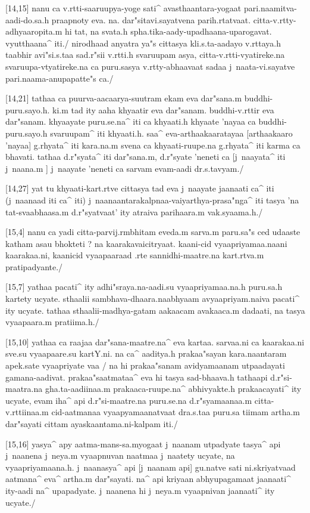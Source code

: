 [14,15]	nanu ca v.rtti-saaruupya-yoge sati^ avasthaantara-yogaat 
pari.naamitva-aadi-do.sa.h praapnoty eva. na. dar"sitavi.sayatvena parih.rtatvaat. 
citta-v.rtty-adhyaaropita.m hi tat, na svata.h 
spha.tika-aady-upadhaana-uparogavat. vyutthaana^ iti./ nirodhaad anyatra ya"s 
cittasya kli.s.ta-aadayo v.rttaya.h taabhir avi"si.s.taa sad.r"sii v.rtti.h svaruupam 
asya, citta-v.rtti-vyatireke.na svaruupa-vtyatireke.na ca puru.sasya 
v.rtty-abhaavaat sadaa j~naata-vi.sayatve pari.naama-anupapatte"s ca./

[14,21]	tathaa ca puurva-aacaarya-suutram ekam eva dar"sana.m buddhi-puru.sayo.h. 
ki.m tad ity aaha khyaatir eva dar"sanam. buddhi-v.rttir eva dar"sanam. khyaayate 
puru.se.na^ iti ca khyaati.h khyaate 'nayaa ca buddhi-puru.sayo.h svaruupam^ iti 
khyaati.h. saa^ eva-arthaakaaratayaa [arthaakaaro 'nayaa] g.rhyata^ iti kara.na.m svena 
ca khyaati-ruupe.na g.rhyata^ iti karma ca bhavati. tathaa d.r"syata^ iti dar"sana.m, 
d.r"syate 'neneti ca [j~naayata^ iti j~naana.m ] j~naayate 'neneti ca sarvam 
evam-aadi dr.s.tavyam./

[14,27]	yat tu khyaati-kart.rtve cittasya tad eva j~naayate jaanaati ca^ iti 
(j~naanaad iti ca^ iti) j~naanaantarakalpnaa-vaiyarthya-prasa"nga^ iti tasya 'na 
tat-svaabhaasa.m d.r"syatvaat' ity atraiva parihaara.m vak.syaama.h./

[15,4]	nanu ca yadi citta-parvij.rmbhitam eveda.m sarva.m paru.sa"s ced udaaste 
katham asau bhokteti ? na kaarakavaicitryaat. kaani-cid vyaapriyamaa.naani 
kaarakaa.ni, kaanicid vyaapaaraad .rte sannidhi-maatre.na kart.rtva.m pratipadyante./

[15,7]	yathaa pacati^ ity adhi"sraya.na-aadi.su vyaapriyamaa.na.h puru.sa.h kartety 
ucyate. sthaalii sambhava-dhaara.naabhyaam avyaapriyam.naiva pacati^ ity ucyate. 
tathaa sthaalii-madhya-gatam aakaacam avakaaca.m dadaati, na tasya vyaapaara.m 
pratiima.h./

[15,10]	yathaa ca raajaa dar"sana-maatre.na^ eva kartaa. sarvaa.ni ca kaarakaa.ni 
sve.su vyaapaare.su kartY.ni. na ca^ aaditya.h prakaa"sayan kara.naantaram apek.sate 
vyaapriyate vaa / na hi prakaa"sanam avidyamaanam utpaadayati gamana-aadivat. 
prakaa"saatmataa^ eva hi tasya sad-bhaava.h tathaapi d.r"si-maatra.na gha.ta-aadiinaa.m 
prakaaca-ruupe.na^ abhivyakte.h prakaacayati^ ity ucyate, evam iha^ api 
d.r"si-maatre.na puru.se.na d.r"syamaanaa.m citta-v.rttiinaa.m cid-aatmanaa vyaapyamaanatvaat 
dra.s.taa puru.sa tiimam artha.m dar"sayati cittam ayaskaantama.ni-kalpam iti./

[15,16]	yasya^ apy aatma-mans-sa.myogaat j~naanam utpadyate tasya^ api j~naanena 
j~neya.m vyaapnuvan naatmaa j~naatety ucyate, na vyaapriyamaana.h. j~naanasya^ api 
[j~naanam api] gu.natve sati ni.skriyatvaad aatmana^ eva^ artha.m dar"sayati. na^ 
api kriyaan abhyupagamaat jaanaati^ ity-aadi na^ upapadyate. j~naanena hi j~neya.m 
vyaapnivan jaanaati^ ity ucyate./

